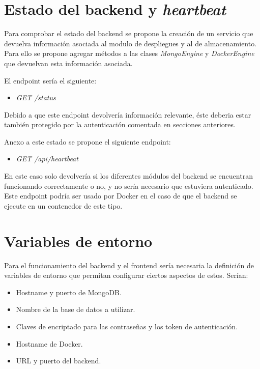 \section{Estado del backend y \textit{heartbeat}}


Para comprobar el estado del backend se propone la creación de un servicio que devuelva información asociada al modulo de despliegues y al de almacenamiento. Para ello se propone agregar métodos a las clases \textit{MongoEngine} y \textit{DockerEngine} que devuelvan esta información asociada.

\bigskip
El endpoint sería el siguiente:
\begin{itemize}
	\item \textit{GET /status}
\end{itemize}

\bigskip
Debido a que este endpoint devolvería información relevante, éste deberia estar también protegido por la autenticación comentada en secciones anteriores.

\bigskip
Anexo a este estado se propone el siguiente endpoint:
\begin{itemize}
	\item \textit{GET /api/heartbeat}
\end{itemize}


\bigskip
En este caso solo devolvería si los diferentes módulos del backend se encuentran funcionando correctamente o no, y no sería necesario que estuviera autenticado. Este endpoint podría ser usado por Docker en el caso de que el backend se ejecute en un contenedor de este tipo.



\section{Variables de entorno}


Para el funcionamiento del backend y el frontend sería necesaria la definición de variables de entorno que permitan configurar ciertos aspectos de estos. Serían:
\begin{itemize}
	\item Hostname y puerto de MongoDB.
	\item Nombre de la base de datos a utilizar.
	\item Claves de encriptado para las contraseñas y los token de autenticación.
	\item Hostname de Docker.
	\item URL y puerto del backend.
\end{itemize}






